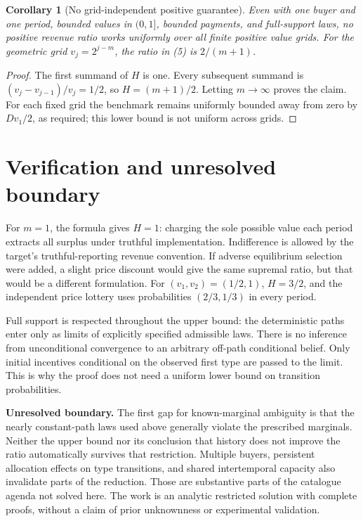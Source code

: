\documentclass[11pt]{article}
\newtheorem{corollary}[theorem]{Corollary}
\theoremstyle{remark}\newtheorem{remark}[theorem]{Remark}
\begin{document}
\begin{corollary}[No grid-independent positive guarantee]\label{cor:none}
Even with one buyer and one period, bounded values in $(0,1]$, bounded payments, and full-support laws, no positive revenue ratio works uniformly over all finite positive value grids. For the geometric grid $v_j=2^{j-m}$, the ratio in (5) is $2/(m+1)$.
\end{corollary}
\begin{proof}
The first summand of $H$ is one. Every subsequent summand is $(v_j-v_{j-1})/v_j=1/2$, so $H=(m+1)/2$. Letting $m\to\infty$ proves the claim. For each fixed grid the benchmark remains uniformly bounded away from zero by $Dv_1/2$, as required; this lower bound is not uniform across grids.
\end{proof}

\section*{Verification and unresolved boundary}
For $m=1$, the formula gives $H=1$: charging the sole possible value each period extracts all surplus under truthful implementation. Indifference is allowed by the target's truthful-reporting revenue convention. If adverse equilibrium selection were added, a slight price discount would give the same supremal ratio, but that would be a different formulation. For $(v_1,v_2)=(1/2,1)$, $H=3/2$, and the independent price lottery uses probabilities $(2/3,1/3)$ in every period.

Full support is respected throughout the upper bound: the deterministic paths enter only as limits of explicitly specified admissible laws. There is no inference from unconditional convergence to an arbitrary off-path conditional belief. Only initial incentives conditional on the observed first type are passed to the limit. This is why the proof does not need a uniform lower bound on transition probabilities.

\textbf{Unresolved boundary.} The first gap for known-marginal ambiguity is that the nearly constant-path laws used above generally violate the prescribed marginals. Neither the upper bound nor its conclusion that history does not improve the ratio automatically survives that restriction. Multiple buyers, persistent allocation effects on type transitions, and shared intertemporal capacity also invalidate parts of the reduction. Those are substantive parts of the catalogue agenda not solved here. The work is an analytic restricted solution with complete proofs, without a claim of prior unknownness or experimental validation.
\end{document}
